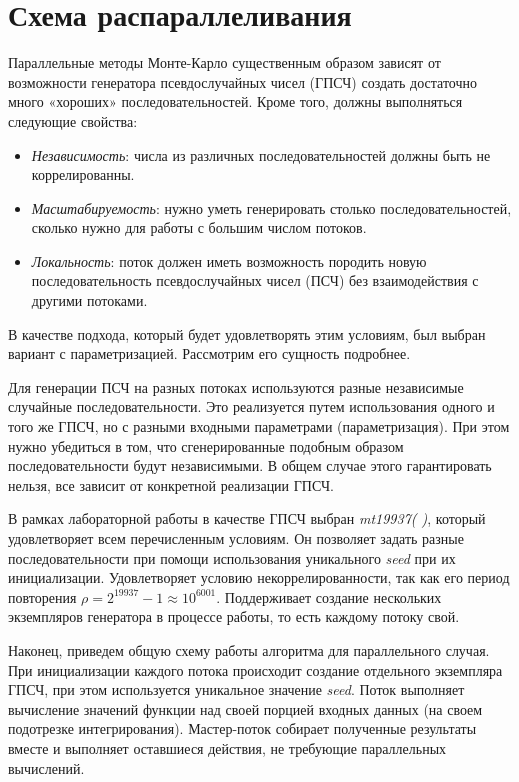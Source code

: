 \documentclass{report}
\begin{document}
\section*{Схема распараллеливания}
\indent\par Параллельные методы Монте-Карло существенным образом зависят от возможности генератора псевдослучайных чисел (ГПСЧ) создать достаточно много «хороших» последовательностей. Кроме того, должны выполняться следующие свойства:
\begin{itemize}
\item \emph{Независимость}: числа из различных последовательностей должны быть не коррелированны.
\item \emph{Масштабируемость}: нужно уметь генерировать столько последовательностей, сколько нужно для работы с большим числом потоков.
\item \emph{Локальность}: поток должен иметь возможность породить новую последовательность псевдослучайных чисел (ПСЧ) без взаимодействия с другими потоками.
\end{itemize}
\par В качестве подхода, который будет удовлетворять этим условиям, был выбран вариант с параметризацией. Рассмотрим его сущность подробнее.
\par Для генерации ПСЧ на разных потоках используются разные независимые случайные последовательности. Это реализуется путем использования одного и того же ГПСЧ, но с разными входными параметрами (параметризация). При этом нужно убедиться в том, что сгенерированные подобным образом последовательности будут независимыми. В общем случае этого гарантировать нельзя, все зависит от конкретной реализации ГПСЧ.
\par В рамках лабораторной работы в качестве ГПСЧ выбран \emph{mt19937( )}, который удовлетворяет всем перечисленным условиям. Он позволяет задать разные последовательности при помощи использования уникального \emph{seed} при их инициализации. Удовлетворяет условию некоррелированности, так как его период повторения $\rho = 2^{19937} - 1 \approx 10^{6001}$. Поддерживает создание нескольких экземпляров генератора в процессе работы, то есть каждому потоку свой.
\par Наконец, приведем общую схему работы алгоритма для параллельного случая. При инициализации каждого потока происходит создание отдельного экземпляра ГПСЧ,  при этом используется уникальное значение \emph{seed}. Поток выполняет вычисление значений функции над своей порцией входных данных (на своем подотрезке интегрирования). Мастер-поток собирает полученные результаты вместе и выполняет оставшиеся действия, не требующие параллельных вычислений.
\newpage
\end{document}

